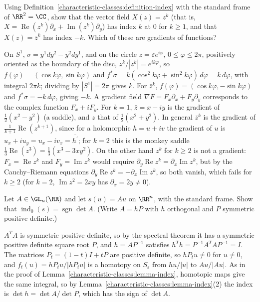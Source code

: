 \begin{exercise}\label{characteristic-classes:exercise-indices-plane}
Using Definition~\ref{characteristic-classes:definition-index} with the standard frame of $\RR^2 = \CC$, show that the vector field $X(z) = z^k$ (that is,
$X = \operatorname{Re}(z^k)\partial_x + \operatorname{Im}(z^k)\partial_y$) has index $k$ at $0$ for $k \geq 1$, and that $X(z) = \bar z^k$ has index $-k$. Which of these are gradients of functions?
\end{exercise}

\begin{solution}
On $S^1$, $\sigma = y^1dy^2 - y^2dy^1$, and on the circle $z = \varepsilon e^{i\varphi}$, $0 \leq \varphi \leq 2\pi$, positively oriented as the boundary of the disc, $z^k/|z^k| = e^{ik\varphi}$,
so $f(\varphi) = (\cos k\varphi, \sin k\varphi)$ and $f^*\sigma = k(\cos^2k\varphi + \sin^2k\varphi)\,d\varphi = k\,d\varphi$, with integral $2\pi k$; dividing by $|S^1| = 2\pi$ gives $k$. For $\bar z^k$,
$f(\varphi) = (\cos k\varphi, -\sin k\varphi)$ and $f^*\sigma = -k\,d\varphi$, giving $-k$. A gradient field $\nabla F = F_x\partial_x + F_y\partial_y$ corresponds to the complex function $F_x + iF_y$.
For $k = 1$, $\bar z = x - iy$ is the gradient of $\frac12(x^2 - y^2)$ (a saddle), and $z$ that of $\frac12(x^2 + y^2)$. In general $\bar z^k$ is the gradient of $\frac{1}{k+1}\operatorname{Re}(z^{k+1})$,
since for a holomorphic $h = u + iv$ the gradient of $u$ is $u_x + iu_y = u_x - iv_x = \overline{h^{\prime}}$; for $k = 2$ this is the monkey saddle
$\frac13\operatorname{Re}(z^3) = \frac13(x^3 - 3xy^2)$. On the other hand $z^k$ for
$k \geq 2$ is not a gradient: $F_x = \operatorname{Re}z^k$ and $F_y = \operatorname{Im}z^k$ would require $\partial_y\operatorname{Re}z^k = \partial_x\operatorname{Im}z^k$, but by the
Cauchy--Riemann equations $\partial_y\operatorname{Re}z^k = -\partial_x\operatorname{Im}z^k$, so both vanish, which fails for $k \geq 2$ (for $k = 2$, $\operatorname{Im}z^2 = 2xy$ has
$\partial_x = 2y \neq 0$).
\end{solution}

\begin{exercise}\label{characteristic-classes:exercise-linear-index}
Let $A \in \GL_n(\RR)$ and let $s(u) = Au$ on $\RR^n$, with the standard frame. Show that $\operatorname{ind}_0(s) = \operatorname{sgn}\det A$. (Write $A = hP$ with $h$ orthogonal and $P$
symmetric positive definite.)
\end{exercise}

\begin{solution}
$A^TA$ is symmetric positive definite, so by the spectral theorem it has a symmetric positive definite square root $P$, and $h = AP^{-1}$ satisfies $h^Th = P^{-1}A^TAP^{-1} = I$. The matrices
$P_t = (1 - t)I + tP$ are positive definite, so $hP_tu \neq 0$ for $u \neq 0$, and $f_t(u) = hP_tu/|hP_tu|$ is a homotopy on $S_\varepsilon$ from $hu/|u|$ to $Au/|Au|$. As in the proof of
Lemma~\ref{characteristic-classes:lemma-index}, homotopic maps give the same integral, so by Lemma~\ref{characteristic-classes:lemma-index}(2) the index is $\det h = \det A/\det P$, which has the
sign of $\det A$.
\end{solution}

